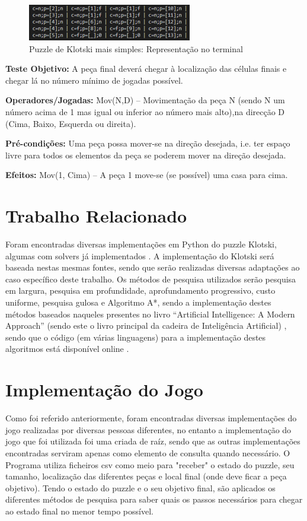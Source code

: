 \documentclass[conference]{IEEEtran}
\begin{document}
\begin{figure}
	\centering
	\includegraphics[width=0.75\linewidth]{klotski3.png}
	\caption{Puzzle de Klotski mais simples: Representação no terminal}
	\label{fig:klotski3}
\end{figure}

\textbf{Teste Objetivo:} A peça final deverá chegar à localização das células finais e chegar lá no número mínimo de jogadas possível.

\textbf{Operadores/Jogadas:} Mov(N,D) – Movimentação da peça N (sendo N um número acima de 1 mas igual ou inferior ao número mais alto),na direcção D (Cima, Baixo, Esquerda ou direita).

\textbf{Pré-condições:} Uma peça possa mover-se na direção desejada, i.e. ter espaço livre para todos os elementos da peça se poderem mover na direção desejada.

\textbf{Efeitos:} Mov(1, Cima) – A peça 1 move-se (se possível) uma casa para cima.



\section{Trabalho Relacionado}
Foram encontradas diversas implementações em Python do puzzle Klotski, algumas com solvers já implementados \cite{b3} \cite{b4} \cite{b5} \cite{b6} \cite{b7}. A implementação do Klotski será baseada nestas mesmas fontes, sendo que serão realizadas diversas adaptações ao caso específico deste trabalho.
Os métodos de pesquisa utilizados serão pesquisa em largura, pesquisa em profundidade, aprofundamento progressivo, custo uniforme, pesquisa gulosa e Algoritmo A*, sendo a implementação destes métodos baseados naqueles presentes no livro “Artificial Intelligence: A Modern Approach” (sendo este o livro principal da cadeira de Inteligência Artificial) \cite{b8}, sendo que o código (em várias linguagens) para a implementação destes algoritmos está disponível online \cite{b9}.

\section{Implementação do Jogo}
Como foi referido anteriormente, foram encontradas diversas implementações do jogo realizadas por diversas pessoas diferentes, no entanto a implementação do jogo que foi utilizada foi uma criada de raíz, sendo que as outras implementações encontradas serviram apenas como elemento de consulta quando necessário.
O Programa utiliza ficheiros csv como meio para "receber" o estado do puzzle, seu tamanho, localização das diferentes peças e local final (onde deve ficar a peça objetivo).
Tendo o estado do puzzle e o seu objetivo final, são aplicados os diferentes métodos de pesquisa para saber quais os passos necessários para chegar ao estado final no menor tempo possível.
\end{document}
